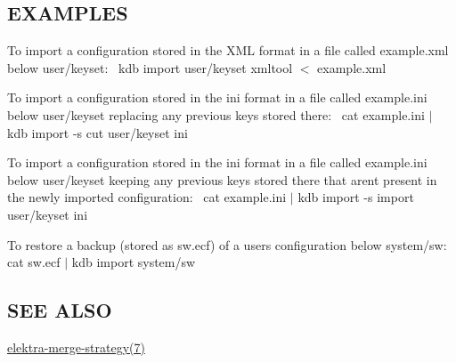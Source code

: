 \subsection*{E\+X\+A\+M\+P\+L\+ES}

To import a configuration stored in the X\+ML format in a file called {\ttfamily example.\+xml} below {\ttfamily user/keyset}\+:~\newline
 {\ttfamily kdb import user/keyset xmltool $<$ example.\+xml}

To import a configuration stored in the {\ttfamily ini} format in a file called {\ttfamily example.\+ini} below {\ttfamily user/keyset} replacing any previous keys stored there\+:~\newline
 {\ttfamily cat example.\+ini $\vert$ kdb import -\/s cut user/keyset ini}

To import a configuration stored in the {\ttfamily ini} format in a file called {\ttfamily example.\+ini} below {\ttfamily user/keyset} keeping any previous keys stored there that aren\textquotesingle{}t present in the newly imported configuration\+:~\newline
 {\ttfamily cat example.\+ini $\vert$ kdb import -\/s import user/keyset ini}

To restore a backup (stored as {\ttfamily sw.\+ecf}) of a user\textquotesingle{}s configuration below {\ttfamily system/sw}\+:~\newline
 {\ttfamily cat sw.\+ecf $\vert$ kdb import system/sw}

\subsection*{S\+EE A\+L\+SO}


\begin{DoxyItemize}
\item \hyperlink{md_doc_help_elektra-merge-strategy_doc_help_elektra-merge-strategy_md}{elektra-\/merge-\/strategy(7)} 
\end{DoxyItemize}
